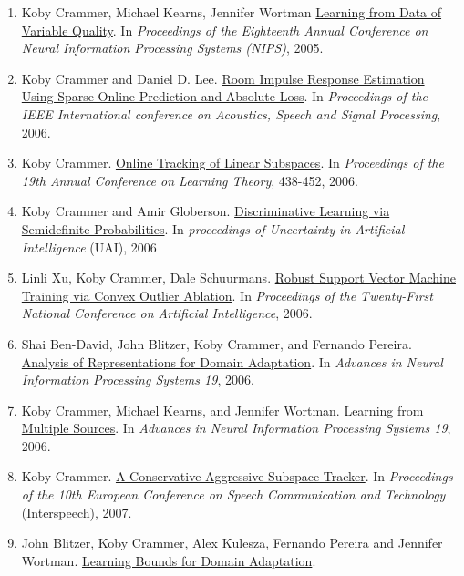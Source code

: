 \documentclass{resume}
\begin{document}
\begin{enumerate}
\item
{Koby Crammer}, Michael Kearns, Jennifer Wortman
\href{http://www.cis.upenn.edu/~crammer/publications/vardata.pdf}{Learning from Data of Variable Quality}.
In {\em Proceedings of the Eighteenth Annual Conference on Neural Information Processing Systems (NIPS)}, 2005.
\item
{Koby Crammer} and Daniel D. Lee.
\href{http://www.cis.upenn.edu/~crammer/publications/icassp06.pdf}{Room Impulse Response Estimation Using Sparse Online Prediction and
Absolute Loss}.
In {\em Proceedings of the IEEE International conference on Acoustics, Speech and Signal Processing}, 2006.
\item {Koby Crammer}.
\href{http://www.cis.upenn.edu/~crammer/publications/colt06.pdf}{Online Tracking of Linear Subspaces}.
In {\em Proceedings of the 19th Annual Conference on Learning Theory},
438-452, 2006.
\item
{Koby Crammer} and Amir Globerson.
\href{http://www.cis.upenn.edu/~crammer/publications/qclass.pdf}{Discriminative Learning via Semidefinite Probabilities}.
In {\em proceedings of Uncertainty in Artificial Intelligence} (UAI), 2006
\item
  Linli Xu, {Koby Crammer}, Dale Schuurmans.
\href{http://www.cis.upenn.edu/~crammer/publications/AAAI0613XuL.pdf}{Robust Support Vector
  Machine Training via Convex Outlier Ablation}.
In {\em Proceedings of the Twenty-First National Conference on
  Artificial Intelligence}, 2006.
\item
Shai Ben-David, John Blitzer, {Koby Crammer}, and Fernando Pereira.
\href{http://www.cis.upenn.edu/~crammer/publications/nips06.pdf}{Analysis of Representations for Domain Adaptation}.
In {\em Advances in Neural Information Processing Systems 19}, 2006.
\item
{Koby Crammer}, Michael Kearns, and Jennifer Wortman.
\href{http://www.cis.upenn.edu/~crammer/publications/multisource_nips07.pdf}{Learning from Multiple Sources}.
In {\em Advances in Neural Information Processing Systems 19}, 2006.
\item
{Koby Crammer}.
\href{http://www.cis.upenn.edu/~crammer/publications/is2007.pdf}{A Conservative Aggressive Subspace Tracker}.
In {\em Proceedings of the 10th European Conference on Speech
  Communication and Technology} (Interspeech), 2007.
\item
John Blitzer, {Koby Crammer}, Alex Kulesza, Fernando Pereira and
  Jennifer Wortman.
\href{http://www.cis.upenn.edu/~crammer/publications/adaptation_weighting.pdf}
{Learning Bounds for Domain Adaptation}.

\end{enumerate}
\end{document}
